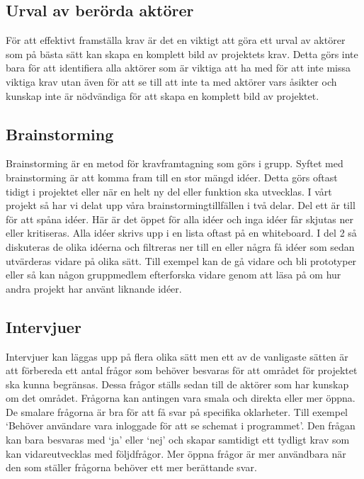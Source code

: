 \subsection{Urval av berörda aktörer}
För att effektivt framställa krav är det en viktigt att göra ett urval av aktörer som på bästa sätt kan skapa en komplett bild av projektets krav\cite{cs_choose_right}. Detta görs inte bara för att identifiera alla aktörer som är viktiga att ha med för att inte missa viktiga krav utan även för att se till att inte ta med aktörer vars åsikter och kunskap inte är nödvändiga för att skapa en komplett bild av projektet.

\subsection{Brainstorming}
Brainstorming är en metod för kravframtagning som görs i grupp. Syftet med brainstorming är att komma fram till en stor mängd idéer. Detta görs oftast tidigt i projektet eller när en helt ny del eller funktion ska utvecklas. I vårt projekt så har vi delat upp våra brainstormingtillfällen i två delar. Del ett är till för att spåna idéer. Här är det öppet för alla idéer och inga idéer får skjutas ner eller kritiseras. Alla idéer skrivs upp i en lista oftast på en whiteboard. I del 2 så diskuteras de olika idéerna och filtreras ner till en eller några få idéer som sedan utvärderas vidare på olika sätt. Till exempel kan de gå vidare och bli prototyper eller så kan någon gruppmedlem efterforska vidare genom att läsa på om hur andra projekt har använt liknande idéer.

\subsection{Intervjuer}\label{sec:ch-intervju}
Intervjuer kan läggas upp på flera olika sätt men ett av de vanligaste sätten är att förbereda ett antal frågor som behöver besvaras för att området för projektet ska kunna begränsas. Dessa frågor ställs sedan till de aktörer som har kunskap om det området. Frågorna kan antingen vara smala och direkta eller mer öppna. De smalare frågorna är bra för att få svar på specifika oklarheter. Till exempel ‘Behöver användare vara inloggade för att se schemat i programmet’. Den frågan kan bara besvaras med ‘ja’ eller ‘nej’ och skapar samtidigt ett tydligt krav som kan vidareutvecklas med följdfrågor. Mer öppna frågor är mer användbara när den som ställer frågorna behöver ett mer berättande svar.

